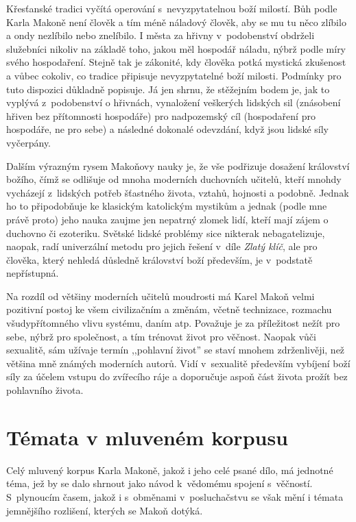 Křesťanské tradici vyčítá operování s~nevyzpytatelnou boží milostí. Bůh podle
Karla Makoně není člověk a tím méně náladový člověk, aby se mu tu něco zlíbilo a
ondy nezlíbilo nebo znelíbilo. I města za hřivny v~podobenství obdrželi služebníci nikoliv na
základě toho, jakou měl hospodář náladu, nýbrž podle míry svého hospodaření.
Stejně tak je zákonité, kdy člověka potká mystická zkušenost a vůbec cokoliv, co
tradice připisuje nevyzpytatelné boží milosti. Podmínky pro tuto dispozici
důkladně popisuje. Já jen shrnu, že stěžejním bodem je, jak to vyplývá
z~podobenství o hřivnách, vynaložení veškerých lidských sil (znásobení hřiven
bez přítomnosti hospodáře) pro nadpozemský cíl (hospodaření pro hospodáře, ne
pro sebe) a následné dokonalé odevzdání, když jsou lidské síly vyčerpány.

Dalším výrazným rysem Makoňovy nauky je, že vše podřizuje dosažení království
božího, čímž se odlišuje od mnoha moderních duchovních učitelů, kteří mnohdy
vycházejí z~lidských potřeb šťastného života, vztahů, hojnosti a podobně. Jednak
ho to připodobňuje ke klasickým katolickým mystikům a jednak (podle mne právě
proto) jeho nauka zaujme jen nepatrný zlomek lidí, kteří mají zájem o duchovno
či ezoteriku. Světské lidské problémy sice nikterak nebagatelizuje, naopak, radí
univerzální metodu pro jejich řešení v~díle {\em Zlatý klíč}, ale pro člověka,
který nehledá důsledně království boží především, je v~podstatě nepřístupná.

Na rozdíl od většiny moderních učitelů moudrosti má Karel Makoň velmi pozitivní
postoj ke všem civilizačním a změnám, včetně technizace, rozmachu
všudypřítomného vlivu systému, daním atp. Považuje je za příležitost nežít pro
sebe, nýbrž pro společnost, a tím trénovat život pro věčnost. Naopak vůči
sexualitě, sám užívaje termín ,,pohlavní život'' se staví mnohem zdrženlivěji,
než většina mně známých moderních autorů. Vidí v~sexualitě především vybíjení
boží síly za účelem vstupu do zvířecího ráje a doporučuje aspoň část života
prožít bez pohlavního života.

\section{Témata v mluveném korpusu}

Celý mluvený korpus Karla Makoně, jakož i jeho celé psané dílo, má jednotné
téma, jež by se dalo shrnout jako návod k~vědomému spojení s~věčností.
S~plynoucím časem, jakož i s~obměnami v~posluchačstvu se však mění i témata
jemnějšího rozlišení, kterých se Makoň dotýká.

